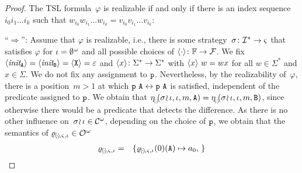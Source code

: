 \begin{proof}
  \medskip

  \noindent The TSL formula~$ \varphi $ is realizable if and only if
  there is an index sequence~$ i_{0}i_{1}\ldots i_{k} $ such that
  $ w_{i_{0}}w_{i_{1}}\ldots w_{i_{k}} = v_{i_{0}} v_{i_{1}} \ldots
  v_{i_{k}} $:

  \smallskip

  ``$ \Rightarrow $'': Assume that $ \varphi $ is realizable, i.e.,
  there is some strategy~$ \sigma \colon \mathcal{I}^{*} \rightarrow \varsigma $ that
  satisfies $ \varphi $ for
  $ \iota = \emptyset^{\hspace{0.5pt}\omega} $ and all possible
  choices of $ \langle \cdot \rangle \colon \mathbb{F} \rightarrow \mathcal{F} $. We fix
  $ \langle \textit{init}_{{\text{\texttt{A}}}} \rangle =
  \langle \textit{init}_{{\text{\texttt{B}}}} \rangle = \langle {\text{\texttt{X}}} \rangle = \varepsilon
  $ and $ \langle x \rangle \colon \Sigma^{*} \rightarrow \Sigma^{*} $ with
  $ \langle x \rangle~w = wx $ for all $ w \in \Sigma^{*} $ and
  $ x \in \Sigma $. We do not fix any assignment to $ {\text{\texttt{p}}}
  $. Nevertheless, by the realizability of~$ \varphi $, there is a
  position~$ m > 1 $ at which
  $ {\text{\texttt{p}}}~{\text{\texttt{A}}} \leftrightarrow {\text{\texttt{p}}}~{\text{\texttt{A}}} $ is
  satisfied, independent of the predicate assigned to $ {\text{\texttt{p}}} $. We
  obtain that
  $ \eval(\branch{\sigma}{\iota},\iota,m,\name{A}) =
  \eval(\branch{\sigma}{\iota},\iota,m,\name{B}) $, \linebreak since
  otherwise there would be a predicate that detects the difference. As
  there is no other influence
  on~$ \sigma \! \wr \hspace{-0.6pt} \iota \in \mathcal{C}^{\omega} $, depending on the
  choice of $ {\text{\texttt{p}}} $, we obtain that the semantics of
  $ \varrho_{\hspace{-1pt}\langle \hspace{-1pt}\cdot
    \hspace{-1pt}\rangle \hspace{-1pt}, \varsigma, \iota} \in
  \mathcal{O}^{\hspace{0.5pt}\omega} $
  \begin{eqnarray*}
   \varrho_{\hspace{-1pt}\langle \hspace{-1pt}\cdot
    \hspace{-1pt}\rangle \hspace{-1pt}, \varsigma, \iota} & = & \{  \varrho_{\hspace{-1pt}\langle \hspace{-1pt}\cdot
    \hspace{-1pt}\rangle \hspace{-1pt}, \varsigma, \iota}(0)({\text{\texttt{A}}}) \mapsto a_{0}, \,
 \}
\end{eqnarray*}
\end{proof}
